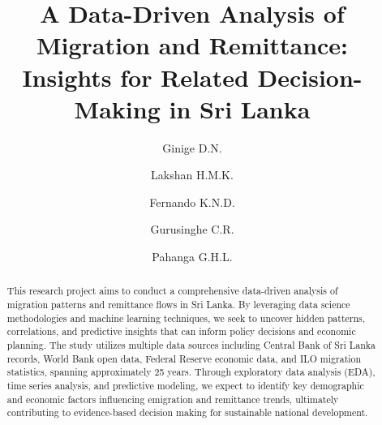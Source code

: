 \documentclass[sigconf]{acmart}
\begin{document}
\title{A Data-Driven Analysis of Migration and Remittance: Insights for Related Decision-Making in Sri Lanka}

\author{Ginige D.N.}

\author{Lakshan H.M.K.}

\author{Fernando K.N.D.}

\author{Gurusinghe C.R.}

\author{Pahanga G.H.L.}

\begin{abstract}
This research project aims to conduct a comprehensive data-driven analysis of migration patterns and remittance flows in Sri Lanka. By leveraging data science methodologies and machine learning techniques, we seek to uncover hidden patterns, correlations, and predictive insights that can inform policy decisions and economic planning. The study utilizes multiple data sources including Central Bank of Sri Lanka records, World Bank open data, Federal Reserve economic data, and ILO migration statistics, spanning approximately 25 years. Through exploratory data analysis (EDA), time series analysis, and predictive modeling, we expect to identify key demographic and economic factors influencing emigration and remittance trends, ultimately contributing to evidence-based decision making for sustainable national development.
\end{abstract}


\maketitle
\end{document}
